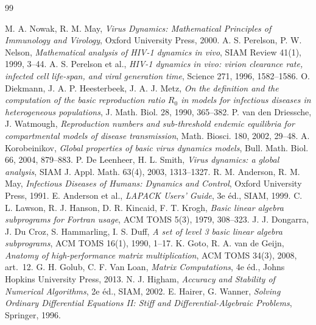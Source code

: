 \documentclass[11pt,a4paper]{report}
\theoremstyle{plain}
\theoremstyle{definition}
\theoremstyle{remark}
\begin{document}
\begin{thebibliography}{99}
 M. A. Nowak, R. M. May, \textit{Virus Dynamics: Mathematical Principles of Immunology and Virology}, Oxford University Press, 2000.
 A. S. Perelson, P. W. Nelson, \textit{Mathematical analysis of HIV-1 dynamics in vivo}, SIAM Review 41(1), 1999, 3--44.
 A. S. Perelson et al., \textit{HIV-1 dynamics in vivo: virion clearance rate, infected cell life-span, and viral generation time}, Science 271, 1996, 1582--1586.
 O. Diekmann, J. A. P. Heesterbeek, J. A. J. Metz, \textit{On the definition and the computation of the basic reproduction ratio $R_0$ in models for infectious diseases in heterogeneous populations}, J. Math. Biol. 28, 1990, 365--382.
 P. van den Driessche, J. Watmough, \textit{Reproduction numbers and sub-threshold endemic equilibria for compartmental models of disease transmission}, Math. Biosci. 180, 2002, 29--48.
 A. Korobeinikov, \textit{Global properties of basic virus dynamics models}, Bull. Math. Biol. 66, 2004, 879--883.
 P. De Leenheer, H. L. Smith, \textit{Virus dynamics: a global analysis}, SIAM J. Appl. Math. 63(4), 2003, 1313--1327.
 R. M. Anderson, R. M. May, \textit{Infectious Diseases of Humans: Dynamics and Control}, Oxford University Press, 1991.
 E. Anderson et al., \textit{LAPACK Users' Guide}, 3e éd., SIAM, 1999.
 C. L. Lawson, R. J. Hanson, D. R. Kincaid, F. T. Krogh, \textit{Basic linear algebra subprograms for Fortran usage}, ACM TOMS 5(3), 1979, 308--323.
 J. J. Dongarra, J. Du Croz, S. Hammarling, I. S. Duff, \textit{A set of level 3 basic linear algebra subprograms}, ACM TOMS 16(1), 1990, 1--17.
 K. Goto, R. A. van de Geijn, \textit{Anatomy of high-performance matrix multiplication}, ACM TOMS 34(3), 2008, art.~12.
 G. H. Golub, C. F. Van Loan, \textit{Matrix Computations}, 4e éd., Johns Hopkins University Press, 2013.
 N. J. Higham, \textit{Accuracy and Stability of Numerical Algorithms}, 2e éd., SIAM, 2002.
 E. Hairer, G. Wanner, \textit{Solving Ordinary Differential Equations II: Stiff and Differential-Algebraic Problems}, Springer, 1996.
\end{thebibliography}
\end{document}
